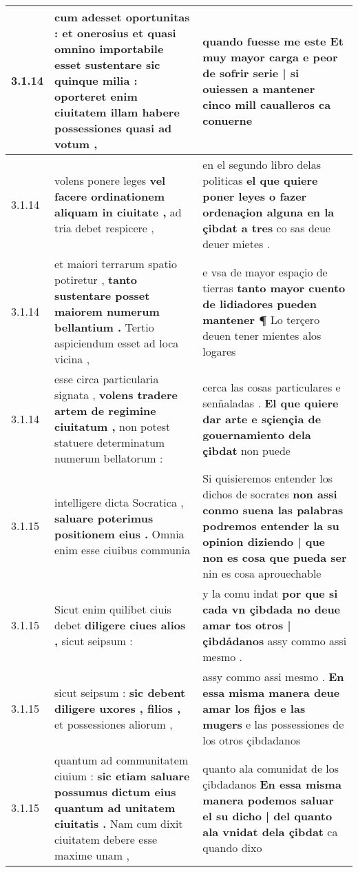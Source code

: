 \begin{tabular}{|p{1cm}|p{6.5cm}|p{6.5cm}|}
3.1.14 & cum adesset oportunitas : \textbf{ et onerosius et quasi omnino importabile esset sustentare sic quinque milia : } oporteret enim ciuitatem illam habere possessiones quasi ad votum , & quando fuesse me este \textbf{ Et muy mayor carga e peor de sofrir serie | si ouiessen a mantener cinco mill caualleros } ca conuerne \\\hline
3.1.14 & volens ponere leges \textbf{ vel facere ordinationem aliquam in ciuitate , } ad tria debet respicere , & en el segundo libro delas politicas \textbf{ el que quiere poner leyes o fazer ordenaçion alguna en la çibdat a tres } co sas deue deuer mietes . \\\hline
3.1.14 & et maiori terrarum spatio potiretur , \textbf{ tanto sustentare posset maiorem numerum bellantium . } Tertio aspiciendum esset ad loca vicina , & e vsa de mayor espaçio de tierras \textbf{ tanto mayor cuento de lidiadores pueden mantener ¶ } Lo terçero deuen tener mientes alos logares \\\hline
3.1.14 & esse circa particularia signata , \textbf{ volens tradere artem de regimine ciuitatum , } non potest statuere determinatum numerum bellatorum : & cerca las cosas particulares e senñaladas . \textbf{ El que quiere dar arte e sçiençia de gouernamiento dela çibdat } non puede \\\hline
3.1.15 & intelligere dicta Socratica , \textbf{ saluare poterimus positionem eius . } Omnia enim esse ciuibus communia & Si quisieremos entender los dichos de socrates \textbf{ non assi conmo suena las palabras podremos entender la su opinion diziendo | que non es cosa que pueda ser } nin es cosa aprouechable \\\hline
3.1.15 & Sicut enim quilibet ciuis debet \textbf{ diligere ciues alios , } sicut seipsum : & y la comu indat \textbf{ por que si cada vn çibdada no deue amar tos otros | çibdảdanos } assy commo assi mesmo . \\\hline
3.1.15 & sicut seipsum : \textbf{ sic debent diligere uxores , filios , } et possessiones aliorum , & assy commo assi mesmo . \textbf{ En essa misma manera deue amar los fijos e las mugers } e las possessiones de los otros çibdadanos \\\hline
3.1.15 & quantum ad communitatem ciuium : \textbf{ sic etiam saluare possumus dictum eius quantum ad unitatem ciuitatis . } Nam cum dixit ciuitatem debere esse maxime unam , & quanto ala comunidat de los çibdadanos \textbf{ En essa misma manera podemos saluar el su dicho | del quanto ala vnidat dela çibdat } ca quando dixo \\\hline

\end{tabular}
